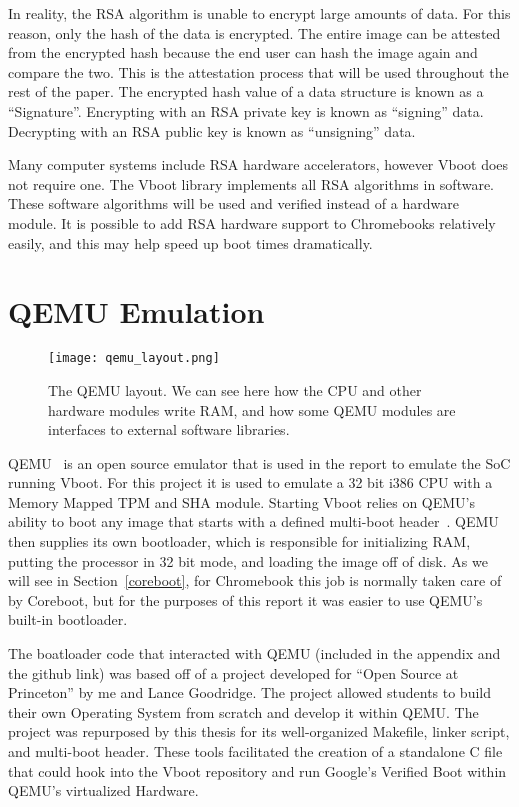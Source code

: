 In reality, the RSA algorithm is unable to encrypt large amounts of data.
For this reason, only the hash of the data is encrypted. 
The entire image can be attested from the encrypted hash because the end user
can hash the image again and compare the two.
This is the attestation process that will be used throughout the rest of the
paper.
The encrypted hash value of a data structure is known as a ``Signature''. 
Encrypting with an RSA private key is known as ``signing'' data.
Decrypting with an RSA public key is known as ``unsigning'' data.

Many computer systems include RSA hardware accelerators, however Vboot does not
require one. 
The Vboot library implements all RSA algorithms in software.
These software algorithms will be used and verified instead of a hardware
module.
It is possible to add RSA hardware support to Chromebooks relatively 
easily, and this may help speed up boot times dramatically.

\section{QEMU Emulation}\label{qemu_em}

\begin{figure}
  \centering
  \texttt{[image: qemu\_layout.png]}
  \caption[QEMU Software Library Layout]{The QEMU layout. We can see here how the CPU and other hardware modules write RAM, and how some QEMU modules are interfaces to external software libraries.}
  \label{fig:qemu_layout}
\end{figure}

QEMU~\cite{qemu-site} is an open source emulator that is used in the report to
emulate the SoC running Vboot.
For this project it is used to emulate a 32 bit i386 CPU with a Memory Mapped TPM and SHA module.
Starting Vboot relies on QEMU's ability to boot any image that starts with a defined multi-boot header~\cite{multiboot}.
QEMU then supplies its own bootloader, which is responsible for initializing RAM, putting the processor in 32 bit mode, and loading the image off of disk.
As we will see in Section~\ref{coreboot}, for Chromebook this job is normally taken care of by Coreboot, but for the purposes of this report it was easier to use QEMU's built-in bootloader.

The boatloader code that interacted with QEMU (included in the appendix and the
github link) was based off of a project developed for ``Open Source at
Princeton'' by me and Lance Goodridge.
The project allowed students to build their own Operating System from scratch and develop it within QEMU\@.
The project was repurposed by this thesis for its well-organized Makefile, linker script, and multi-boot header.
These tools facilitated the creation of a standalone C file that could hook into the Vboot repository and run Google's Verified Boot within QEMU's virtualized Hardware.

